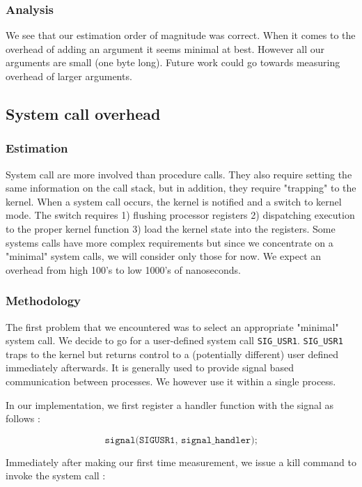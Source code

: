 \subsubsection{Analysis}

We see that our estimation order of magnitude was correct. When it comes to the overhead of adding
an argument it seems minimal at best. However all our arguments are small (one byte long). 
Future work could go towards measuring overhead of larger arguments.

\subsection{System call overhead}

\subsubsection{Estimation}

System call are more involved than procedure calls. They also require setting the same information on the call stack,
but in addition, they require "trapping" to the kernel. When a system call occurs, the kernel is notified and a switch
to kernel mode. The switch requires 1) flushing processor registers 2) dispatching execution
to the proper kernel function 3) load the kernel state into the registers. Some systems calls have more complex requirements
but since we concentrate on a "minimal" system calls, we will consider only those for now. We expect an
overhead from high 100's to low 1000's of nanoseconds.

\subsubsection{Methodology}

The first problem that we encountered was to select an appropriate "minimal" system call. We decide to
go for a user-defined system call \texttt{SIG\_USR1}. \texttt{SIG\_USR1} traps to the kernel but returns control
to a (potentially different) user defined immediately afterwards. It is generally used to provide signal based
communication between processes. We however use it within a single process.

In our implementation, we first register a handler function with the signal as follows :

$$ \texttt{signal(SIGUSR1, signal\_handler);}$$

Immediately after making our first time measurement, we issue a kill command to
invoke the system call :

